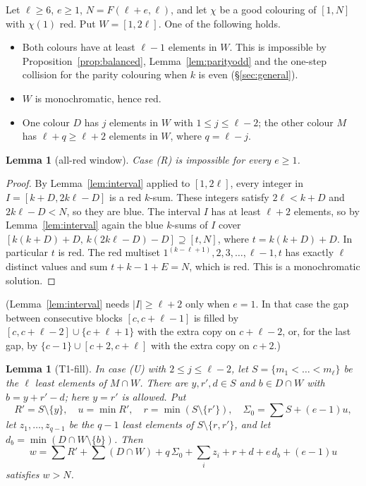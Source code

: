 \documentclass[11pt]{amsart}
\newtheorem{lemma}[theorem]{Lemma}
\theoremstyle{definition}
\newcommand{\F}{F}
\begin{document}
Let $\ell\ge6$, $e\ge1$, $N=\F(\ell+e,\ell)$, and let $\chi$ be a good colouring of $[1,N]$ with $\chi(1)$ red. Put $W=[1,2\ell]$. One of the following holds.
\begin{itemize}
\item[(B)] Both colours have at least $\ell-1$ elements in $W$. This is impossible by Proposition~\ref{prop:balanced}, Lemma~\ref{lem:parityodd} and the one-step collision for the parity colouring when $k$ is even (\S\ref{sec:general}).
\item[(R)] $W$ is monochromatic, hence red.
\item[(U)] One colour $D$ has $j$ elements in $W$ with $1\le j\le\ell-2$; the other colour $M$ has $\ell+q\ge\ell+2$ elements in $W$, where $q=\ell-j$.
\end{itemize}

\begin{lemma}[all-red window]\label{lem:allred}
Case (R) is impossible for every $e\ge1$.
\end{lemma}

\begin{proof}
By Lemma~\ref{lem:interval} applied to $[1,2\ell]$, every integer in $I=[k+D,2k\ell-D]$ is a red $k$-sum. These integers satisfy $2\ell<k+D$ and $2k\ell-D<N$, so they are blue. The interval $I$ has at least $\ell+2$ elements, so by Lemma~\ref{lem:interval} again the blue $k$-sums of $I$ cover $[k(k+D)+D,\,k(2k\ell-D)-D]\supseteq[t,N]$, where $t=k(k+D)+D$. In particular $t$ is red. The red multiset $1^{(k-\ell+1)},2,3,\dots,\ell-1,t$ has exactly $\ell$ distinct values and sum $t+k-1+E=N$, which is red. This is a monochromatic solution.
\end{proof}

\noindent (Lemma~\ref{lem:interval} needs $|I|\ge\ell+2$ only when $e=1$. In that case the gap between consecutive blocks $[c,c+\ell-1]$ is filled by $[c,c+\ell-2]\cup\{c+\ell+1\}$ with the extra copy on $c+\ell-2$, or, for the last gap, by $\{c-1\}\cup[c+2,c+\ell]$ with the extra copy on $c+2$.)

\begin{lemma}[T1-fill]\label{lem:fill}
In case (U) with $2\le j\le\ell-2$, let $S=\{m_1<\dots<m_\ell\}$ be the $\ell$ least elements of $M\cap W$. There are $y,r',d\in S$ and $b\in D\cap W$ with $b=y+r'-d$; here $y=r'$ is allowed. Put
\[
R'=S\setminus\{y\},\quad u=\min R',\quad r=\min(S\setminus\{r'\}),\quad \Sigma_0=\textstyle\sum S+(e-1)u,
\]
let $z_1,\dots,z_{q-1}$ be the $q-1$ least elements of $S\setminus\{r,r'\}$, and let $d_b=\min(D\cap W\setminus\{b\})$. Then
\[
w=\textstyle\sum R'+\sum(D\cap W)+q\,\Sigma_0+\sum_iz_i+r+d+e\,d_b+(e-1)u
\]
satisfies $w>N$.
\end{lemma}
\end{document}
